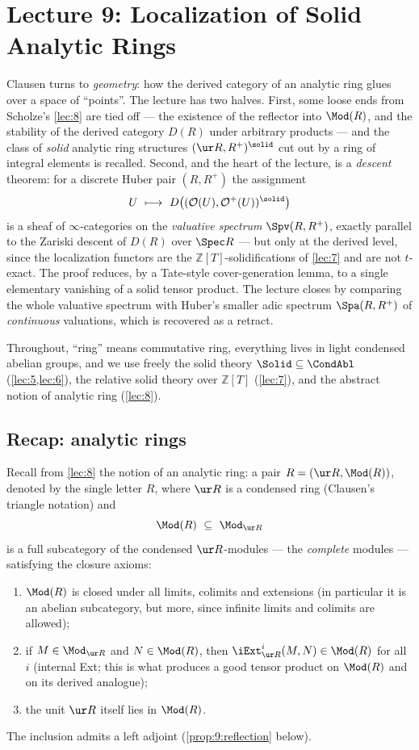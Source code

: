 \section{Lecture 9: Localization of Solid Analytic Rings}
\label{lec:9}

Clausen turns to \emph{geometry}: how the derived category of an analytic ring
glues over a space of ``points''. The lecture has two halves. First, some
loose ends from Scholze's \cref{lec:8} are tied off --- the existence of the
reflector into $\Mod(R)$, and the stability of the derived category $D(R)$
under arbitrary products --- and the class of \emph{solid} analytic ring
structures $(\ur R,R^{+})^{\solid}$ cut out by a ring of integral elements is
recalled. Second, and the heart of the lecture, is a \emph{descent} theorem:
for a discrete Huber pair $(R,R^{+})$ the assignment
\[
U\ \longmapsto\ D\bigl((\mathcal O(U),\mathcal O^{+}(U))^{\solid}\bigr)
\]
is a sheaf of $\infty$-categories on the \emph{valuative spectrum}
$\Spv(R,R^{+})$, exactly parallel to the Zariski descent of $D(R)$ over
$\Spec R$ --- but only at the derived level, since the localization functors
are the $\mathbb{Z}[T]$-solidifications of \cref{lec:7} and are not $t$-exact.
The proof reduces, by a Tate-style cover-generation lemma, to a single
elementary vanishing of a solid tensor product. The lecture closes by
comparing the whole valuative spectrum with Huber's smaller adic spectrum
$\Spa(R,R^{+})$ of \emph{continuous} valuations, which is recovered as a
retract.

Throughout, ``ring'' means commutative ring, everything lives in light
condensed abelian groups, and we use freely the solid theory
$\Solid\subseteq\CondAbl$ (\cref{lec:5,lec:6}), the relative solid theory over
$\mathbb{Z}[T]$ (\cref{lec:7}), and the abstract notion of analytic ring
(\cref{lec:8}).

\subsection{Recap: analytic rings}

Recall from \cref{lec:8} the notion of an analytic ring: a pair $R=(\ur R,
\Mod(R))$, denoted by the single letter $R$, where $\ur R$ is a condensed ring
(Clausen's triangle notation) and
\begin{equation*}
\Mod(R)\ \subseteq\ \Mod_{\ur R}
\end{equation*}
is a full subcategory of the condensed $\ur R$-modules --- the \emph{complete}
modules --- satisfying the closure axioms:
\begin{enumerate}
\item $\Mod(R)$ is closed under all limits, colimits and extensions (in
particular it is an abelian subcategory, but more, since infinite limits and
colimits are allowed);
\item if $M\in\Mod_{\ur R}$ and $N\in\Mod(R)$, then $\iExt^{i}_{\ur R}(M,N)\in
\Mod(R)$ for all $i$ (internal Ext; this is what produces a good tensor product
on $\Mod(R)$ and on its derived analogue);
\item the unit $\ur R$ itself lies in $\Mod(R)$.
\end{enumerate}
The inclusion admits a left adjoint (\cref{prop:9:reflection} below).

